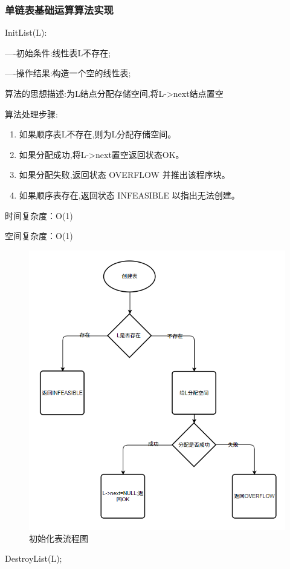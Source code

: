 \documentclass[supercite]{Experimental_Report}
\theoremstyle{definition}
\begin{document}
\subsubsection{单链表基础运算算法实现}
InitList(L):

----初始条件:线性表L不存在;

----操作结果:构造一个空的线性表;

算法的思想描述:为L结点分配存储空间,将L->next结点置空

算法处理步骤:
\begin{enumerate}
	\renewcommand{\labelenumi}{\theenumi)}
	\item 如果顺序表L不存在,则为L分配存储空间。
	\item 如果分配成功,将L->next置空返回状态OK。
	\item 如果分配失败,返回状态 OVERFLOW 并推出该程序块。
	\item 如果顺序表存在,返回状态 INFEASIBLE 以指出无法创建。
\end{enumerate}

时间复杂度：O(1)

空间复杂度：O(1)
\begin{figure}[H] %
	\begin{center}
		\includegraphics[width=0.8\linewidth]{images/1.2.3.png}
		\caption{初始化表流程图}
	\end{center}
\end{figure}
DestroyList(L);
\end{document}
